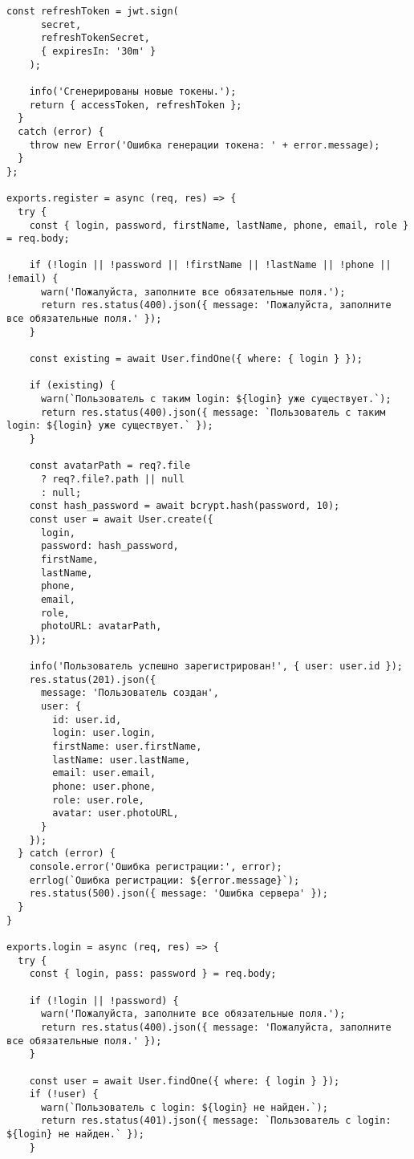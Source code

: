 \begin{lstlisting}[style=CodeListing]
    const refreshToken = jwt.sign(
      secret,
      refreshTokenSecret,
      { expiresIn: '30m' }
    );
    
    info('Сгенерированы новые токены.');
    return { accessToken, refreshToken };
  }
  catch (error) {
    throw new Error('Ошибка генерации токена: ' + error.message);
  }
};

exports.register = async (req, res) => {
  try {
    const { login, password, firstName, lastName, phone, email, role } = req.body;

    if (!login || !password || !firstName || !lastName || !phone || !email) {
      warn('Пожалуйста, заполните все обязательные поля.');
      return res.status(400).json({ message: 'Пожалуйста, заполните все обязательные поля.' });
    }
    
    const existing = await User.findOne({ where: { login } });

    if (existing) {
      warn(`Пользователь с таким login: ${login} уже существует.`);
      return res.status(400).json({ message: `Пользователь с таким login: ${login} уже существует.` });
    }
    
    const avatarPath = req?.file
      ? req?.file?.path || null
      : null;
    const hash_password = await bcrypt.hash(password, 10);
    const user = await User.create({
      login,
      password: hash_password,
      firstName,
      lastName,
      phone,
      email,
      role,
      photoURL: avatarPath,
    });

    info('Пользователь успешно зарегистрирован!', { user: user.id });
    res.status(201).json({
      message: 'Пользователь создан',
      user: {
        id: user.id,
        login: user.login,
        firstName: user.firstName,
        lastName: user.lastName,
        email: user.email,
        phone: user.phone,
        role: user.role,
        avatar: user.photoURL,
      }
    });
  } catch (error) {
    console.error('Ошибка регистрации:', error);
    errlog(`Ошибка регистрации: ${error.message}`);
    res.status(500).json({ message: 'Ошибка сервера' });
  }
}

exports.login = async (req, res) => {
  try {
    const { login, pass: password } = req.body;

    if (!login || !password) {
      warn('Пожалуйста, заполните все обязательные поля.');
      return res.status(400).json({ message: 'Пожалуйста, заполните все обязательные поля.' });
    }

    const user = await User.findOne({ where: { login } });
    if (!user) {
      warn(`Пользователь с login: ${login} не найден.`);
      return res.status(401).json({ message: `Пользователь с login: ${login} не найден.` });
    }


\end{lstlisting}

